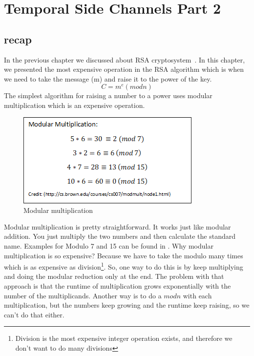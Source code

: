 \chapter{Temporal Side Channels Part 2} \label{cha:Temporal Side Channels Part 2}

\section*{recap}\label{sec:recap}

In the previous chapter we discussed about RSA cryptosystem~\cite{wikiRSA}. In this chapter, we
presented the most expensive operation in the RSA algorithm which is when we need to take the
message (m) and raise it to the power of the key.
\[ C = m^e(modn) \] The simplest algorithm for raising a number to a power uses
modular multiplication which is an expensive operation.

\begin{figure}[!ht]
    \centering
    \includegraphics{images/modmul.png}
    \caption{Modular multiplication} \label{fig:modmul}
\end{figure}

Modular multiplication is pretty straightforward. It works just like modular
addition. You just multiply the two numbers and then calculate the standard
name. Examples for Modulo 7 and 15 can be found in . Why
modular multiplication is so expensive? Because we have to take the modulo many
times which is as expensive as division\footnote{Division is the most expensive integer
operation exists, and  therefore we don't want to do many divisions}. So, one way
to do this is by keep multiplying and doing the modular reduction only at
the end. The problem with that approach is that the runtime of multiplication grows exponentially
with the number of the multiplicands. 
Another way is to do a \( mod n \) with each multiplication, but the numbers keep growing 
and the runtime keep raising, so we can't do that either. 

